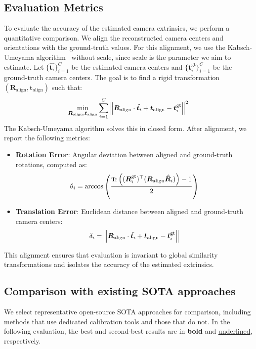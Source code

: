 \documentclass[a4paper, 10pt, conference]{ieeeconf}      %
\newcommand{\vect}[1]{\bm{#1}}
\newcommand{\mat}[1]{\bm{#1}}
\begin{document}
\subsection{Evaluation Metrics}

To evaluate the accuracy of the estimated camera extrinsics, we perform a quantitative comparison. We align the reconstructed camera centers and orientations with the ground-truth values. For this alignment, we use the Kabsch-Umeyama algorithm~\cite{umeyama2002least} without scale, since scale is the parameter we aim to estimate. Let $\{\hat{\vect{t}_i}\}_{i=1}^C$ be the estimated camera centers and $\{\vect{t}_i^{\text{gt}}\}_{i=1}^C$ be the ground-truth camera centers. The goal is to find a rigid transformation $(\mat{R}_{\text{align}}, \vect{t}_{\text{align}})$ such that:
\begin{equation} \footnotesize
\min_{\mat{R}_{\text{align}}, \vect{t}_{\text{align}}} \sum_{i=1}^{C} \left\|  \mat{R}_{\text{align}} \cdot \hat{\vect{t}_i} + \vect{t}_{\text{align}} - \vect{t}_i^{\text{gt}} \right\|^2
\end{equation}
The Kabsch-Umeyama algorithm solves this in closed form. After alignment, we report the following metrics:
\begin{itemize}
    \item \textbf{Rotation Error}: Angular deviation between aligned and ground-truth rotations, computed as:
    \begin{equation} \footnotesize
    \theta_i = \arccos\left( \frac{\text{Tr}\left((\mat{R}_i^{\text{gt}})^\top (\mat{R}_{\text{align}} \hat{\mat{R}}_i)\right) - 1}{2} \right)
    \end{equation}
    \item \textbf{Translation Error}: Euclidean distance between aligned and ground-truth camera centers:
    \begin{equation} \footnotesize
    \delta_i = \left\|  \mat{R}_{\text{align}} \cdot \hat{\vect{t}_i} + \vect{t}_{\text{align}} - \vect{t}_i^{\text{gt}} \right\|
    \end{equation}
\end{itemize}
This alignment ensures that evaluation is invariant to global similarity transformations and isolates the accuracy of the estimated extrinsics.


\subsection{Comparison with existing SOTA approaches}
We select representative open-source SOTA approaches for comparison, including methods that use dedicated calibration tools and those that do not.
In the following evaluation, the best and second-best results are in \textbf{bold} and \underline{underlined}, respectively.
\end{document}
